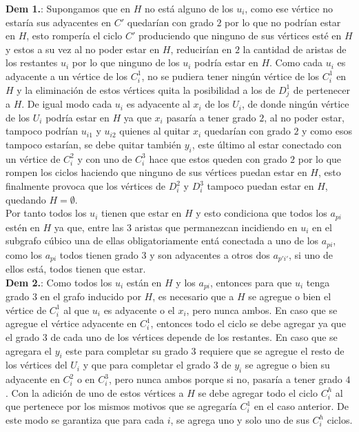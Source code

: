 \documentclass{article}
\begin{document}
\textbf{Dem 1.}: Supongamos que en $H$ no est\'a alguno de los $u_i$, como ese v\'ertice no estar\'ia sus adyacentes en $C'$ quedar\'ian con grado $2$ por lo que no podr\'ian estar en $H$, esto romper\'ia el ciclo $C'$ produciendo 
que ninguno de sus v\'ertices est\'e en $H$ y estos a su vez al no poder estar en $H$, reducir\'ian en $2$ la cantidad de aristas de los restantes $u_i$ por lo que ninguno de los $u_i$ podr\'ia estar en $H$. Como cada $u_i$ es adyacente a un v\'ertice de los $C_i^1$, no se pudiera tener ning\'un v\'ertice de los $C_i^1$ en $H$
y la eliminaci\'on de estos v\'ertices quita la posibilidad a los de $D_j^1$ de pertenecer a $H$. De igual modo cada $u_i$ es adyacente al $x_i$ de los $U_i$, de donde ning\'un v\'ertice de los $U_i$ podr\'ia estar en $H$ ya que $x_i$ pasar\'ia a tener grado $2$, al no poder estar, tampoco podr\'ian $u_{i1}$ y $u_{i2}$ quienes al quitar $x_i$ 
quedar\'ian con grado $2$ y como esos tampoco estar\'ian, se debe quitar tambi\'en $y_i$, este \'ultimo al estar conectado con un v\'ertice de $C_i^2$ y  con uno de $C_i^3$ hace que estos queden con grado $2$ por lo que rompen los ciclos 
haciendo que ninguno de sus v\'ertices puedan estar en $H$, esto finalmente provoca que los v\'ertices de $D_i^2$ y $D_i^3$ tampoco puedan estar en $H$, quedando $H = \emptyset$.\\ 

Por tanto todos los $u_i$ tienen que estar en $H$ y esto condiciona que todos los $a_{pi}$ est\'en en $H$ ya que, entre las $3$ aristas que permanezcan incidiendo en $u_i$ en el subgrafo c\'ubico 
una de ellas obligatoriamente ent\'a conectada a uno de los $a_{pi}$, como los $a_{pi}$ todos tienen grado $3$ y son adyacentes a otros dos $a_{p'i'}$, si uno de ellos est\'a, todos tienen que estar.\\ 

\textbf{Dem 2.}: Como todos los $u_i$ est\'an en $H$ y los $a_{pi}$, entonces para que $u_i$ tenga grado $3$ en el grafo inducido por $H$, es necesario que a $H$ se agregue o bien el v\'ertice de $C_i^1$ al que $u_i$ es adyacente o el 
$x_i$, pero nunca ambos. En caso que se agregue el v\'ertice adyacente en $C_i^1$, entonces todo el ciclo se debe agregar ya que el grado $3$ de cada uno de los v\'ertices depende de los restantes. En caso que se agregara el $y_i$ este para completar su grado $3$
requiere que se agregue el resto de los v\'ertices del $U_i$ y que para completar el grado $3$ de $y_i$ se agregue o bien su adyacente en $C_i^2$ o  en $C_i^3$, pero nunca ambos porque si no, pasar\'ia a tener grado $4$. Con la adici\'on de uno de estos v\'ertices a 
$H$ se debe agregar todo el ciclo $C_i^h$ al que pertenece por los mismos motivos que se agregar\'ia $C_i^1$ en el caso anterior. De este modo se garantiza que para cada $i$, se agrega uno y solo uno de sus $C_i^h$ ciclos.\\ 
\end{document}
